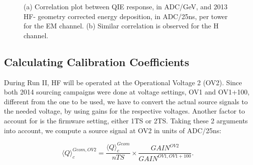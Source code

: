 \begin{figure}[htb]
   \begin{center}
      \caption{(a) Correlation plot between QIE response, in ADC/GeV, and 2013 HF-
               geometry corrected energy deposition, in ADC/25\unit{ns}, per tower
               for the EM channel.
               (b) Similar correlation is observed for the H channel.}
      \label{fig:QIE_Slope}
   \end{center}
\end{figure}

\subsection{Calculating Calibration Coefficients}
During Run II, HF will be operated at the Operational Voltage 2 (OV2). Since
both 2014 sourcing campaigns were done at voltage settings, OV1 and OV1+100,
different from the one to be used, we have to convert the actual source signals to
the needed voltage, by using gains for the respective voltages. Another factor to
account for is the firmware setting, either 1TS or 2TS. Taking these 2 arguments
into account, we compute a source signal at OV2 in units of ADC/25\unit{ns}:

\begin{center}
	\begin{equation}
		\label{eq:Sig_OV2}
		{\langle{Q}\rangle}^{Geom,OV2}_{c} = \frac{{\langle{Q}\rangle}^{Geom}_{c}}{nTS} \times \frac{{GAIN}^{OV2}}{{GAIN}^{OV1,OV1+100}}.
	\end{equation}
\end{center}

